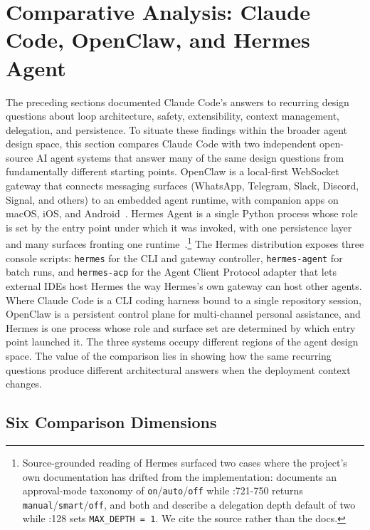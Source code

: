 \section{Comparative Analysis: Claude Code, OpenClaw, and Hermes Agent}
\label{sec:compare}

The preceding sections documented Claude Code's answers to recurring design questions about loop architecture, safety, extensibility, context management, delegation, and persistence. To situate these findings within the broader agent design space, this section compares Claude Code with two independent open-source AI agent systems that answer many of the same design questions from fundamentally different starting points. OpenClaw is a local-first WebSocket gateway that connects messaging surfaces (WhatsApp, Telegram, Slack, Discord, Signal, and others) to an embedded agent runtime, with companion apps on macOS, iOS, and Android~\citep{openclaw2026}. Hermes Agent is a single Python process whose role is set by the entry point under which it was invoked, with one persistence layer and many surfaces fronting one runtime~\citep{hermesagent2026}.\footnote{Source-grounded reading of Hermes surfaced two cases where the project's own documentation has drifted from the implementation:  documents an approval-mode taxonomy of \texttt{on}/\texttt{auto}/\texttt{off} while :721-750 returns \texttt{manual}/\texttt{smart}/\texttt{off}, and both  and  describe a delegation depth default of two while :128 sets \texttt{MAX\_DEPTH = 1}. We cite the source rather than the docs.} The Hermes distribution exposes three console scripts: \texttt{hermes} for the CLI and gateway controller, \texttt{hermes-agent} for batch runs, and \texttt{hermes-acp} for the Agent Client Protocol adapter that lets external IDEs host Hermes the way Hermes's own gateway can host other agents. Where Claude Code is a CLI coding harness bound to a single repository session, OpenClaw is a persistent control plane for multi-channel personal assistance, and Hermes is one process whose role and surface set are determined by which entry point launched it. The three systems occupy different regions of the agent design space. The value of the comparison lies in showing how the same recurring questions produce different architectural answers when the deployment context changes.

\subsection{Six Comparison Dimensions}
\label{sec:compare:dimensions}

